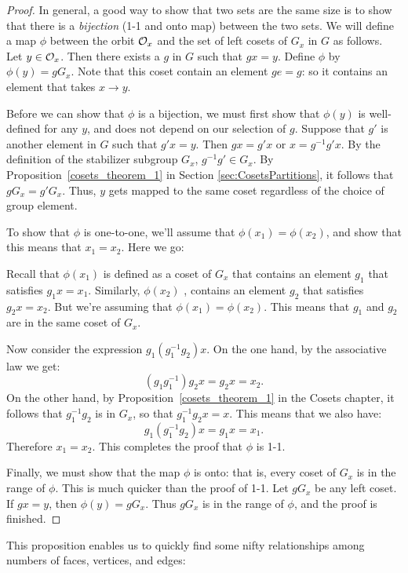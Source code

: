 \begin{proof}
In general, a good way to show that two sets are the same size is to show that there is a \emph{bijection} (1-1 and onto map) between the two sets.  
 We will define a map $\phi$
between the orbit ${\cal O}_x$ and the set of left cosets of $G_x$ in $G$ as follows. Let $y \in {\cal O}_x$. Then there 
exists a $g$ in $G$ such that $g x = y$. Define $\phi$ by $\phi( y ) 
= g G_x$. Note that this coset contain an element $ge=g$:  so it contains an element that takes $x\rightarrow y$.  

Before we can show that $\phi$ is a bijection, we must first show that $\phi(y)$ is well-defined for any $y$, and does 
not depend on our selection of $g$. Suppose that $g'$ is another 
element in $G$ such that $g'x = y$. Then $g x = g' x$ or $x= g^{-1} g' x$. 
By the definition of the stabilizer subgroup $G_x$, $g^{-1}g'\in G_x$. By Proposition~\ref{cosets_theorem_1} in Section \ref{sec:CosetsPartitions}, it follows that 
 $g G_x = g' G_x$. Thus, $y$ gets mapped to the same 
coset regardless of the choice of group element.


To show that $\phi$ is one-to-one, we'll assume that $\phi(x_1) =
\phi(x_2)$, and show that this means that $x_1=x_2$. Here we go: 

Recall that $\phi(x_1)$ is defined as a coset of $G_x$ that contains an element $g_1$ that satisfies $g_1x=x_1.$   Similarly,  $\phi(x_2)$ , contains  an element $g_2$ that satisfies $g_2x=x_2$. But we're assuming that $\phi(x_1) =
\phi(x_2)$.  This means that $g_1$ and $g_2$ are in the same coset of $G_x$.  

Now consider the expression $g_1(g_1^{-1}g_2)x$. On the one hand, by the associative law we get:
$$(g_1g_1^{-1})g_2x=g_2x=x_2.$$ 
 On the other hand, by Proposition~\ref{cosets_theorem_1} in the Cosets chapter, it follows that $g_1^{-1}g_2$ is in $G_x$, so that $g_1^{-1}g_2x=x$.  This means that we also have:
$$g_1(g_1^{-1}g_2)x=g_1x=x_1.$$
  Therefore $x_1=x_2$.  This completes the proof that $\phi$ is 1-1.

Finally, we must show
that the map $\phi$ is onto: that is, every coset of $G_x$ is in the range of $\phi$. This is much quicker than the proof of 1-1. 
Let $g G_x$ be any  left coset. If $g x =y$, then $\phi(y) = g G_x$.  Thus $gG_x$ is in the range of $\phi$, and the proof is finished.
\end{proof}

This proposition enables us to quickly find some nifty relationships among numbers of faces, vertices, and edges:

